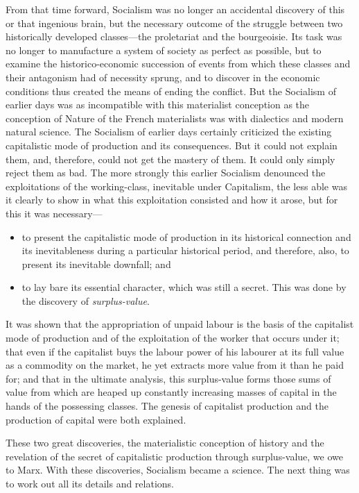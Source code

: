 From that time forward, Socialism was no longer an accidental discovery of this
or that ingenious brain, but the necessary outcome of the struggle between two
historically developed classes---the proletariat and the bourgeoisie. Its task
was no longer to manufacture a system of society as perfect as possible, but to
examine the historico-economic succession of events from which these classes and
their antagonism had of necessity sprung, and to discover in the economic
conditions thus created the means of ending the conflict. But the Socialism of
earlier days was as incompatible with this materialist conception as the
conception of Nature of the French materialists was with dialectics and modern
natural science. The Socialism of earlier days certainly criticized the existing
capitalistic mode of production and its consequences. But it could not explain
them, and, therefore, could not get the mastery of them. It could only simply
reject them as bad. The more strongly this earlier Socialism denounced the
exploitations of the working-class, inevitable under Capitalism, the less able
was it clearly to show in what this exploitation consisted and how it arose, but
for this it was necessary---
%
\begin{itemize}
  \item{
    to present the capitalistic mode of production in its historical connection
    and its inevitableness during a particular historical period, and therefore,
    also, to present its inevitable downfall; and
  }
  \item{
    to lay bare its essential character, which was still a secret. This was done
    by the discovery of \emph{surplus-value}.
  }
\end{itemize}
%
It was shown that the appropriation of unpaid labour is the basis of the
capitalist mode of production and of the exploitation of the worker that occurs
under it; that even if the capitalist buys the labour power of his labourer at
its full value as a commodity on the market, he yet extracts more value from it
than he paid for; and that in the ultimate analysis, this surplus-value forms
those sums of value from which are heaped up constantly increasing masses of
capital in the hands of the possessing classes. The genesis of capitalist
production and the production of capital were both explained.

These two great discoveries, the materialistic conception of history and the
revelation of the secret of capitalistic production through surplus-value, we
owe to Marx. With these discoveries, Socialism became a science. The next thing
was to work out all its details and relations.

\printendnotes